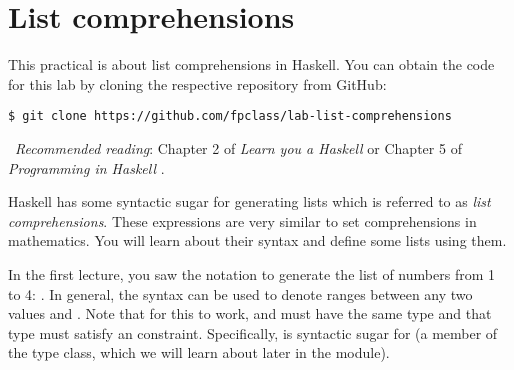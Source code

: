 \section{List comprehensions}

This practical is about list comprehensions in Haskell. You can obtain the code for this lab by cloning the respective repository from GitHub:
\begin{verbatim}
$ git clone https://github.com/fpclass/lab-list-comprehensions
\end{verbatim}

\makebox[0.5cm]{\faBook}~\emph{Recommended reading}: Chapter 2 of \emph{Learn you a Haskell} \citep{lipovaca2011learn} or Chapter 5 of \emph{Programming in Haskell} \citep{hutton2016programming}.

Haskell has some syntactic sugar for generating lists which is referred to as \emph{list comprehensions}. These expressions are very similar to set comprehensions in mathematics. You will learn about their syntax and define some lists using them.

In the first lecture, you saw the \haskellIn{[1..4]} notation to generate the list of numbers from 1 to 4: \haskellIn{[1,2,3,4]}. In general, the \haskellIn{[n..m]} syntax can be used to denote ranges between any two values  and . Note that for this to work,  and  must have the same type and that type must satisfy an  constraint. Specifically, \haskellIn{[n..m]} is syntactic sugar for  (a member of the  type class, which we will learn about later in the module).

\taskLine


\taskLine


\taskLine

